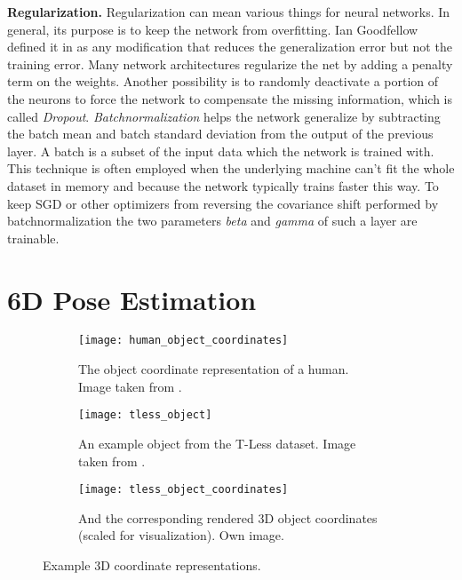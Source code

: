 \noindent\textbf{Regularization.} Regularization can mean various things for neural networks. In general, its purpose is to keep the network from overfitting. Ian Goodfellow defined it in \cite{goodfellow} as any modification that reduces the generalization error but not the training error. Many network architectures regularize the net by adding a penalty term on the weights. Another possibility is to randomly deactivate a portion of the neurons to force the network to compensate the missing information, which is called \textit{Dropout}. \textit{Batchnormalization} helps the network generalize by subtracting the batch mean and batch standard deviation from the output of the previous layer. A batch is a subset of the input data which the network is trained with. This technique is often employed when the underlying machine can't fit the whole dataset in memory and because the network typically trains faster this way. To keep SGD or other optimizers from reversing the covariance shift performed by batchnormalization the two parameters \textit{beta} and \textit{gamma} of such a layer are trainable.

\section{6D Pose Estimation}

\begin{figure}[!tbp]
	\centering
	\begin{subfigure}[t]{0.3\textwidth}
		\centering
    	\texttt{[image: human\_object\_coordinates]}
    	\caption{The object coordinate representation of a human. Image taken from \cite{tsharp}.}
    	\label{fig:human_object_coordinates}
	\end{subfigure}
	\begin{subfigure}[t]{0.3\textwidth}
		\centering
    	\texttt{[image: tless\_object]}
    	\caption{An example object from the T-Less dataset. Image taken from \cite{tless}.}
    	\label{fig:tless_object}
	\end{subfigure}
	\begin{subfigure}[t]{0.3\textwidth}
		\centering
    	\texttt{[image: tless\_object\_coordinates]}
    	\caption{And the corresponding rendered 3D object coordinates (scaled for visualization). Own image.}
    	\label{fig:tless_object_coordinates}
	\end{subfigure}
	\caption{Example 3D coordinate representations.}
\end{figure} 

